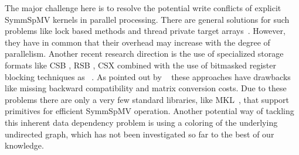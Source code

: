 


The major challenge here is to resolve the potential write conflicts of explicit 
\acrfull{SymmSpMV} kernels in parallel processing.
There are general solutions for such problems like 
lock based methods and thread private target
arrays~\cite{sparseX,thread_private_symm_spmv,Krotkiewski:2010:PSS:1752612.1752682,Mironowicz:2015}. However, they have in common that their overhead may increase with the degree of parallelism.
Another recent research direction is the use of specialized storage formats 
like CSB \cite{CSB}, RSB \cite{RSB}, CSX \cite{sparseX} combined with the use of bitmasked 
register blocking techniques as  ~\cite{Buluc:2011:RMA:2058524.2059503}. As pointed out 
by ~\cite{liu2015spmv} these approaches have drawbacks
 like missing backward compatibility and matrix conversion costs. 
Due to these problems there are only a very few standard libraries, like 
\acrshort{MKL}~\cite{MKL}, that support primitives for efficient \acrshort{SymmSpMV} operation.
Another potential way of tackling this inherent data dependency problem is using a \DTWO coloring 
 of the underlying undirected graph, which has not been investigated so far to the best of our knowledge.

